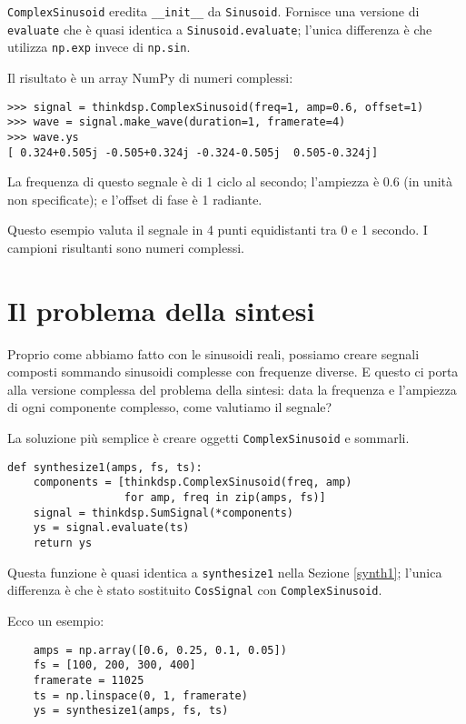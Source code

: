 \documentclass[12pt,a4paper]{book}
\begin{document}
{\tt ComplexSinusoid} eredita \verb"__init__" da {\tt Sinusoid}. Fornisce una versione di {\tt evaluate} che è quasi identica a {\tt Sinusoid.evaluate}; l'unica differenza è che utilizza {\tt np.exp} invece di {\tt np.sin}.

Il risultato è un array NumPy di numeri complessi:

\begin{verbatim} 
>>> signal = thinkdsp.ComplexSinusoid(freq=1, amp=0.6, offset=1)
>>> wave = signal.make_wave(duration=1, framerate=4)
>>> wave.ys
[ 0.324+0.505j -0.505+0.324j -0.324-0.505j  0.505-0.324j]
 \end{verbatim} 

La frequenza di questo segnale è di 1 ciclo al secondo; l'ampiezza è 0.6 (in unità non specificate); e l'offset di fase è 1 radiante.

Questo esempio valuta il segnale in 4 punti equidistanti tra 0 e 1 secondo. I campioni risultanti sono numeri complessi.

\section{Il problema della sintesi} 

Proprio come abbiamo fatto con le sinusoidi reali, possiamo creare segnali composti sommando sinusoidi complesse con frequenze diverse. E questo ci porta alla versione complessa del problema della sintesi: data la frequenza e l'ampiezza di ogni componente complesso, come valutiamo il segnale?

La soluzione più semplice è creare oggetti {\tt ComplexSinusoid} e sommarli.

\begin{verbatim} 
def synthesize1(amps, fs, ts):
    components = [thinkdsp.ComplexSinusoid(freq, amp)
                  for amp, freq in zip(amps, fs)]
    signal = thinkdsp.SumSignal(*components)
    ys = signal.evaluate(ts)
    return ys
 \end{verbatim} 

Questa funzione è quasi identica a {\tt synthesize1} nella Sezione \ref{synth1}; l'unica differenza è che è stato sostituito {\tt CosSignal} con {\tt ComplexSinusoid}.

Ecco un esempio:

\begin{verbatim} 
    amps = np.array([0.6, 0.25, 0.1, 0.05])
    fs = [100, 200, 300, 400]
    framerate = 11025
    ts = np.linspace(0, 1, framerate)
    ys = synthesize1(amps, fs, ts)
 \end{verbatim} 
\end{document}

